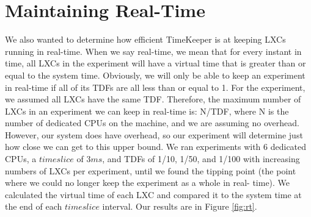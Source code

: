 \section{Maintaining Real-Time}
We also wanted to determine how efficient TimeKeeper is at keeping LXCs running in real-time. When we say real-time, we mean that for every instant in time, all LXCs in the experiment will have a virtual time that is greater than or equal to the system time. Obviously, we will only be able to keep an experiment in real-time if all of its TDFs are all less than or equal to 1. For the experiment, we assumed all LXCs have the same TDF. Therefore, the maximum number of LXCs in an experiment we can keep in real-time is: N/TDF, where N is the number of dedicated CPUs on the machine, and we are assuming no overhead. However, our system does have overhead, so our experiment will determine just how close we can get to this upper bound. We ran experiments with 6 dedicated CPUs, a $timeslice$ of 3$ms$, and TDFs of 1/10, 1/50, and 1/100 with increasing numbers of LXCs per experiment, until we found the tipping point (the point where we could no longer keep the experiment as a whole in real- time). We calculated the virtual time of each LXC and compared it to the system time at the end of each $timeslice$ interval. Our results are in Figure \ref{fig:rt}. 

